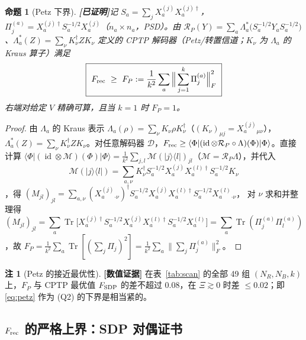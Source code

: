 \documentclass[11pt,a4paper]{ctexart}
\newtheorem{proposition}{命题}
\theoremstyle{definition}
\newtheorem{remark}{注}
\newcommand{\proved}{\textcolor{green!45!black}{\textbf{[已证明]}}}
\newcommand{\numeric}{\textcolor{blue!70!black}{\textbf{[数值证据]}}}
\newcommand{\Tr}{\operatorname{Tr}}
\newcommand{\id}{\operatorname{id}}
\newcommand{\Frec}{F_{\rm rec}}
\begin{document}
\begin{proposition}[Petz 下界]\proved{}\label{prop:petz}
记 $S_a=\sum_{j}X_a^{(j)}X_a^{(j)\dagger}$，$\Pi_j^{(a)}=X_a^{(j)\dagger}S_a^{-1/2}X_a^{(j)}$（$n_a\times n_a$，PSD）。由
$\mathcal R_P(Y)=\sum_a\Lambda_a^*\!\big(S_a^{-1/2}Y_aS_a^{-1/2}\big)$、$\Lambda_a^*(Z)=\sum_\nu K_\nu^\dagger ZK_\nu$ 定义的 CPTP 解码器（Petz/转置信道；$K_\nu$ 为 $\Lambda_a$ 的 Kraus 算子）满足
\begin{equation}\label{eq:petz}
\boxed{\ \Frec\ \ge\ F_P:=\frac{1}{k^2}\sum_a\Big\|\sum_{j=1}^k\Pi_j^{(a)}\Big\|_F^2\ }
\end{equation}
右端对给定 $V$ 精确可算，且当 $k=1$ 时 $F_P=1$。
\end{proposition}
\begin{proof}
由 $\Lambda_a$ 的 Kraus 表示 $\Lambda_a(\rho)=\sum_\nu K_\nu\rho K_\nu^\dagger$（$(K_\nu)_{\mu j}=X_a^{(j)}{}_{\mu\nu}$），$\Lambda_a^*(Z)=\sum_\nu K_\nu^\dagger ZK_\nu$。对任意解码器 $\mathcal D$，$\Frec\ge\langle\Phi|(\id\otimes\mathcal R_P\circ\Lambda)(\Phi)|\Phi\rangle$。直接计算
$\langle\Phi|(\id\otimes\mathcal M)(\Phi)|\Phi\rangle=\frac1{k^2}\sum_{j,l}\mathcal M(|j\rangle\langle l|)_{jl}$（$\mathcal M=\mathcal R_P\Lambda$），并代入
\[
\mathcal M(|j\rangle\langle l|)=\sum_{a,\nu}K_\nu^\dagger S_a^{-1/2}X_a^{(j)}X_a^{(l)\dagger}S_a^{-1/2}K_\nu
\]
，得
$(M_{jl})_{jl}=\sum_{a,\nu}(X_a^{(j)}{}_{\cdot\nu})^\dagger S_a^{-1/2}X_a^{(j)}X_a^{(l)\dagger}S_a^{-1/2}X_a^{(l)}{}_{\cdot\nu}$，
对 $\nu$ 求和并整理得 \[
(M_{jl})_{jl}=\sum_a\Tr\big[X_a^{(j)\dagger}S_a^{-1/2}X_a^{(j)}X_a^{(l)\dagger}S_a^{-1/2}X_a^{(l)}\big]=\sum_a\Tr(\Pi_j^{(a)}\Pi_l^{(a)})
\]
，故 $F_P=\frac1{k^2}\sum_a\Tr[(\sum_j\Pi_j)^2]=\frac1{k^2}\sum_a\|\sum_j\Pi_j^{(a)}\|_F^2$。
\end{proof}

\begin{remark}[Petz 的接近最优性]\numeric{} 在表~\ref{tab:scan} 的全部 49 组 $(N_R,N_B,k)$ 上，$F_P$ 与 CPTP 最优值 $F_{\rm SDP}$ 的差不超过 $0.08$，在 $\Xi\gtrsim0$ 时差 $\le0.02$；即 \eqref{eq:petz} 作为 (Q2) 的下界是相当紧的。
\end{remark}

\subsection{$F_{\rm rec}$ 的严格上界：SDP 对偶证书}
\end{document}
